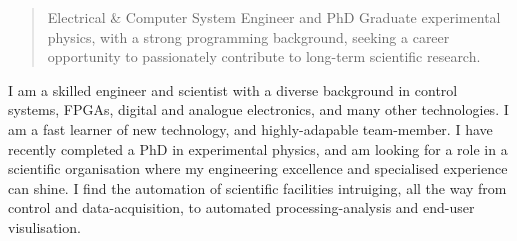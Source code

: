 \documentclass[10pt,a4paper,ragged2e,withhyper]{altacv}
\begin{document}
\begin{paracol}{2}
        \switchcolumn
        
        \vspace{-0.2em}
		
		{\textalignment
            \begin{quote}
            	Electrical \& Computer System Engineer and PhD Graduate experimental physics, with a strong programming background, seeking a career opportunity to passionately contribute to long-term scientific research.
            \end{quote}
        \vspace{0.5em}
		
		I am a skilled engineer and scientist with a diverse background in control systems, FPGAs, digital and analogue electronics, and many other technologies. I am a fast learner of new technology, and highly-adapable team-member. 
		I have recently completed a PhD in experimental physics, and am looking for a role in a scientific organisation where my engineering excellence and specialised experience can shine.\newline
		I find the automation of scientific facilities intruiging, all the way from control and \newline data-acquisition, to automated processing-analysis and end-user visulisation.
		}
        
        \vspace{-1em}


\end{paracol}
\end{document}

